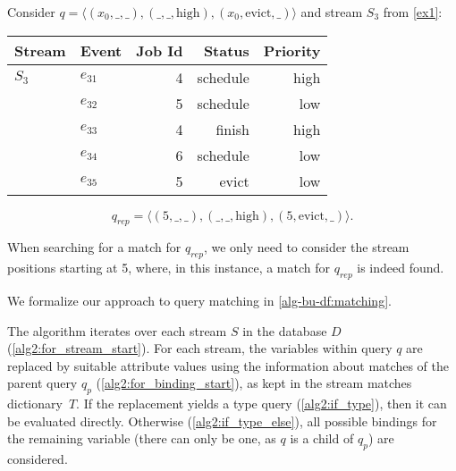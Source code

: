 \begin{example}
	\label{ex:matching}
	Consider $q = \langle
	(x_0,\_,\_),(\_,\_,\text{high}),(x_0,\text{evict},\_)
	\rangle$ and stream $S_3$ from \autoref{ex1}:
	\begin{center}
		\smallskip
		{\footnotesize
			\begin{tabular}{l lrrr}
				\toprule
				Stream & Event &  Job Id  &  Status  &  Priority\\
				\midrule
				$S_3$ & $e_{31}$   & 4 & schedule & high  \\
				& $e_{32}$   & 5 & schedule & low  \\
				& $e_{33}$   & 4 & finish & high  \\
				& $e_{34}$   & 6 & schedule & low  \\
				& $e_{35}$   & 5 & evict & low  \\
				\bottomrule
		\end{tabular}}
	\end{center}
	$$q_{\textit{rep}}=\langle
	(5,\_,\_),(\_,\_,\text{high}),(5,\text{evict},\_)
	\rangle.$$

	When
	searching for a match for $q_{\textit{rep}}$, we only need to consider
	the
	stream
	positions starting at 5, where, in this instance, a match for
	$q_{\textit{rep}}$ is
	indeed found.
	
\end{example}

We formalize our approach to query matching in \autoref{alg-bu-df:matching}.

The algorithm iterates over each
stream $S$ in the database $D$
(\autoref{alg2:for_stream_start}).
For each stream, the variables within query $q$ are replaced by suitable
attribute values using the information about matches of the parent query
$q_p$ (\autoref{alg2:for_binding_start}), as kept in the stream matches
dictionary~$T$.
If the replacement yields a type query (\autoref{alg2:if_type}), then it can
be evaluated directly. Otherwise
(\autoref{alg2:if_type_else}), all possible bindings for
the remaining variable (there can only be one, as $q$ is a child of $q_p$)
are considered.

